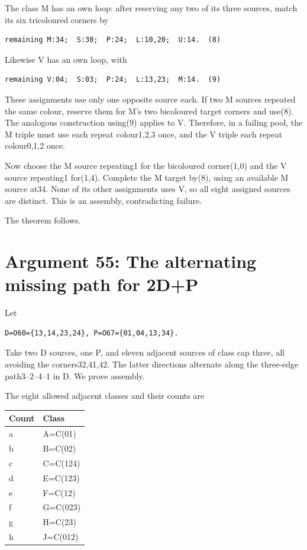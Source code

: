 \documentclass[
  10pt,
]{article}
\begin{document}
The class M has an own loop: after reserving any two of its three
sources, match its six tricoloured corners by

\begin{verbatim}
remaining M:34;  S:30;  P:24;  L:10,20;  U:14.  (8)
\end{verbatim}

Likewise V has an own loop, with

\begin{verbatim}
remaining V:04;  S:03;  P:24;  L:13,23;  M:14.  (9)
\end{verbatim}

These assignments use only one opposite source each. If two M sources
repeated the same colour, reserve them for M's two bicoloured target
corners and use(8). The analogous construction using(9) applies to V.
Therefore, in a failing pool, the M triple must use each repeat
colour1,2,3 once, and the V triple each repeat colour0,1,2 once.

Now choose the M source repeating1 for the bicoloured corner(1,0) and
the V source repeating1 for(1,4). Complete the M target by(8), using an
available M source at34. None of its other assignments uses V, so all
eight assigned sources are distinct. This is an assembly, contradicting
failure.

The theorem follows.

\hypertarget{arg-55}{%
\section{Argument 55: The alternating missing path for
2D+P}\label{arg-55}}

Let

\begin{verbatim}
D=O60={13,14,23,24}, P=O67={01,04,13,34}.
\end{verbatim}

Take two D sources, one P, and eleven adjacent sources of class cap
three, all avoiding the corners32,41,42. The latter directions alternate
along the three-edge path3--2--4--1 in D. We prove assembly.

The eight allowed adjacent classes and their counts are

\begin{longtable}[]{@{}ll@{}}
\toprule\noalign{}
Count & Class \\
\midrule\noalign{}
\endhead
\bottomrule\noalign{}
\endlastfoot
a & A=C(01) \\
b & B=C(02) \\
c & C=C(124) \\
d & E=C(123) \\
e & F=C(12) \\
f & G=C(023) \\
g & H=C(23) \\
h & J=C(012) \\
\end{longtable}
\end{document}

